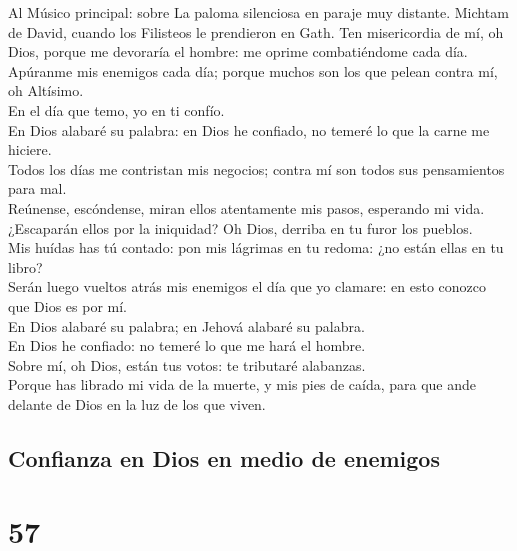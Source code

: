  Al Músico principal: sobre La paloma silenciosa en paraje
muy distante. Michtam de David, cuando los Filisteos le prendieron en
Gath. Ten misericordia de mí, oh Dios, porque me devoraría el hombre: me
oprime combatiéndome cada día.\\
 Apúranme mis enemigos cada día; porque muchos son los que
pelean contra mí, oh Altísimo.\\
 En el día que temo, yo en ti confío.\\
 En Dios alabaré su palabra: en Dios he confiado, no
temeré lo que la carne me hiciere.\\
 Todos los días me contristan mis negocios; contra mí son
todos sus pensamientos para mal.\\
 Reúnense, escóndense, miran ellos atentamente mis pasos,
esperando mi vida.\\
 ¿Escaparán ellos por la iniquidad? Oh Dios, derriba en tu
furor los pueblos.\\
 Mis huídas has tú contado: pon mis lágrimas en tu redoma:
¿no están ellas en tu libro?\\
 Serán luego vueltos atrás mis enemigos el día que yo
clamare: en esto conozco que Dios es por mí.\\
 En Dios alabaré su palabra; en Jehová alabaré su
palabra.\\
 En Dios he confiado: no temeré lo que me hará el
hombre.\\
 Sobre mí, oh Dios, están tus votos: te tributaré
alabanzas.\\
 Porque has librado mi vida de la muerte, y mis pies de
caída, para que ande delante de Dios en la luz de los que viven.

\hypertarget{confianza-en-dios-en-medio-de-enemigos}{%
\subsection{Confianza en Dios en medio de
enemigos}\label{confianza-en-dios-en-medio-de-enemigos}}

\hypertarget{section-56}{%
\section{57}\label{section-56}}

